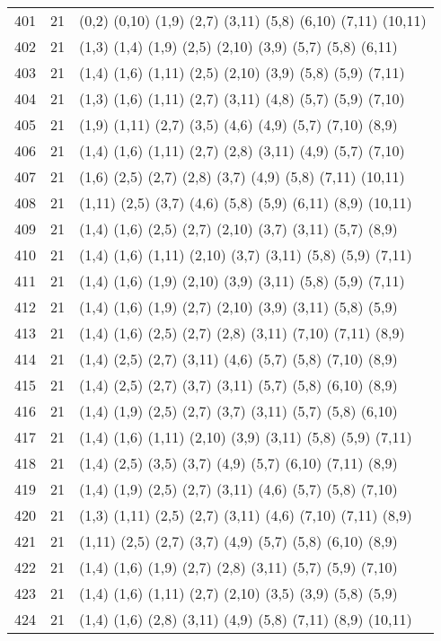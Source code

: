 {\begin{longtable}{lll}
401 & 21 & (0,2) (0,10) (1,9) (2,7) (3,11) (5,8) (6,10) (7,11) (10,11) \\
402 & 21 & (1,3) (1,4) (1,9) (2,5) (2,10) (3,9) (5,7) (5,8) (6,11) \\
403 & 21 & (1,4) (1,6) (1,11) (2,5) (2,10) (3,9) (5,8) (5,9) (7,11) \\
404 & 21 & (1,3) (1,6) (1,11) (2,7) (3,11) (4,8) (5,7) (5,9) (7,10) \\
405 & 21 & (1,9) (1,11) (2,7) (3,5) (4,6) (4,9) (5,7) (7,10) (8,9) \\
406 & 21 & (1,4) (1,6) (1,11) (2,7) (2,8) (3,11) (4,9) (5,7) (7,10) \\
407 & 21 & (1,6) (2,5) (2,7) (2,8) (3,7) (4,9) (5,8) (7,11) (10,11) \\
408 & 21 & (1,11) (2,5) (3,7) (4,6) (5,8) (5,9) (6,11) (8,9) (10,11) \\
409 & 21 & (1,4) (1,6) (2,5) (2,7) (2,10) (3,7) (3,11) (5,7) (8,9) \\
410 & 21 & (1,4) (1,6) (1,11) (2,10) (3,7) (3,11) (5,8) (5,9) (7,11) \\
411 & 21 & (1,4) (1,6) (1,9) (2,10) (3,9) (3,11) (5,8) (5,9) (7,11) \\
412 & 21 & (1,4) (1,6) (1,9) (2,7) (2,10) (3,9) (3,11) (5,8) (5,9) \\
413 & 21 & (1,4) (1,6) (2,5) (2,7) (2,8) (3,11) (7,10) (7,11) (8,9) \\
414 & 21 & (1,4) (2,5) (2,7) (3,11) (4,6) (5,7) (5,8) (7,10) (8,9) \\
415 & 21 & (1,4) (2,5) (2,7) (3,7) (3,11) (5,7) (5,8) (6,10) (8,9) \\
416 & 21 & (1,4) (1,9) (2,5) (2,7) (3,7) (3,11) (5,7) (5,8) (6,10) \\
417 & 21 & (1,4) (1,6) (1,11) (2,10) (3,9) (3,11) (5,8) (5,9) (7,11) \\
418 & 21 & (1,4) (2,5) (3,5) (3,7) (4,9) (5,7) (6,10) (7,11) (8,9) \\
419 & 21 & (1,4) (1,9) (2,5) (2,7) (3,11) (4,6) (5,7) (5,8) (7,10) \\
420 & 21 & (1,3) (1,11) (2,5) (2,7) (3,11) (4,6) (7,10) (7,11) (8,9) \\
421 & 21 & (1,11) (2,5) (2,7) (3,7) (4,9) (5,7) (5,8) (6,10) (8,9) \\
422 & 21 & (1,4) (1,6) (1,9) (2,7) (2,8) (3,11) (5,7) (5,9) (7,10) \\
423 & 21 & (1,4) (1,6) (1,11) (2,7) (2,10) (3,5) (3,9) (5,8) (5,9) \\
424 & 21 & (1,4) (1,6) (2,8) (3,11) (4,9) (5,8) (7,11) (8,9) (10,11) \\

\end{longtable}}
